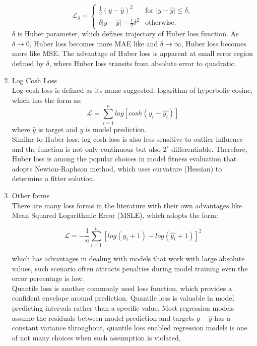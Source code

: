 \begin{enumerate}
\begin{equation}
    \mathcal{L}_\delta = \left\{ 
    \begin{array}{ll}
        \frac {1}{2} (y - \hat{y})^2 & \text{for } |y-\hat{y}| \leq \delta, \\
        \delta |y - \hat{y}| - \frac{1}{2} \delta^2 & \text{otherwise.} 
    \end{array}\right.
\end{equation}
$\delta$ is Huber parameter, which defines trajectory of Huber loss function. As $\delta \rightarrow 0$, Huber loss becomes more MAE like and $\delta \rightarrow \infty$, Huber loss becomes more like MSE. The advantage of Huber loss is apparent at small error region defined by $\delta$, where Huber loss transits from absolute error to quadratic. 
    \item Log Cosh Loss \\
Log cosh loss is defined as its name suggested: logarithm of hyperbolic cosine, which has the form as:
\begin{equation}
    \mathcal{L} = \sum_{i=1}^n log[cosh(y_i-\hat{y_i})]
\end{equation}
where $\hat{y}$ is target and $y$ is model prediction. \\
Similar to Huber loss, log cosh loss is also less sensitive to outlier influence and the function is not only continuous but also $2^{\circ}$ differentiable. Therefore, Huber loss is among the popular choices in model fitness evaluation that adopts Newton-Raphson method, which uses curvature (Hessian) to determine a fitter solution. 
    \item Other forms\\
There are many loss forms in the literature with their own advantages like Mean Squared Logarithmic Error (MSLE), which adopts the form:

\begin{equation}
    \mathcal{L} = -\frac{1}{n}\sum_{i=1}^n [log (y_i + 1) -  log(\hat{y_i} + 1) ]^2 
\end{equation}

which has advantages in dealing with models that work with large absolute values, such scenario often attracts penalties during model training even the error percentage is low. \\
Quantile loss is another commonly used loss function, which provides a confident envelope around prediction. Quantile loss is valuable in model predicting intervals rather than a specific value. Most regression models assume the residuals between model prediction and targets $y-\hat{y}$ has a constant variance throughout, quantile loss enabled regression models is one of not many choices when such assumption is violated, 
\end{enumerate}